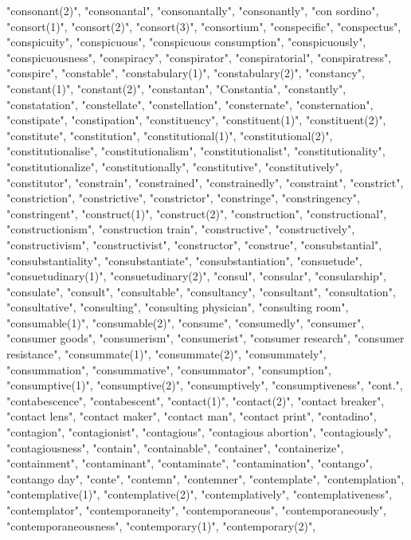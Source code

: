 "consonant(2)",
"consonantal",
"consonantally",
"consonantly",
"con sordino",
"consort(1)",
"consort(2)",
"consort(3)",
"consortium",
"conspecific",
"conspectus",
"conspicuity",
"conspicuous",
"conspicuous consumption",
"conspicuously",
"conspicuousness",
"conspiracy",
"conspirator",
"conspiratorial",
"conspiratress",
"conspire",
"constable",
"constabulary(1)",
"constabulary(2)",
"constancy",
"constant(1)",
"constant(2)",
"constantan",
"Constantia",
"constantly",
"constatation",
"constellate",
"constellation",
"consternate",
"consternation",
"constipate",
"constipation",
"constituency",
"constituent(1)",
"constituent(2)",
"constitute",
"constitution",
"constitutional(1)",
"constitutional(2)",
"constitutionalise",
"constitutionalism",
"constitutionalist",
"constitutionality",
"constitutionalize",
"constitutionally",
"constitutive",
"constitutively",
"constitutor",
"constrain",
"constrained",
"constrainedly",
"constraint",
"constrict",
"constriction",
"constrictive",
"constrictor",
"constringe",
"constringency",
"constringent",
"construct(1)",
"construct(2)",
"construction",
"constructional",
"constructionism",
"construction train",
"constructive",
"constructively",
"constructivism",
"constructivist",
"constructor",
"construe",
"consubstantial",
"consubstantiality",
"consubstantiate",
"consubstantiation",
"consuetude",
"consuetudinary(1)",
"consuetudinary(2)",
"consul",
"consular",
"consularship",
"consulate",
"consult",
"consultable",
"consultancy",
"consultant",
"consultation",
"consultative",
"consulting",
"consulting physician",
"consulting room",
"consumable(1)",
"consumable(2)",
"consume",
"consumedly",
"consumer",
"consumer goods",
"consumerism",
"consumerist",
"consumer research",
"consumer resistance",
"consummate(1)",
"consummate(2)",
"consummately",
"consummation",
"consummative",
"consummator",
"consumption",
"consumptive(1)",
"consumptive(2)",
"consumptively",
"consumptiveness",
"cont.",
"contabescence",
"contabescent",
"contact(1)",
"contact(2)",
"contact breaker",
"contact lens",
"contact maker",
"contact man",
"contact print",
"contadino",
"contagion",
"contagionist",
"contagious",
"contagious abortion",
"contagiously",
"contagiousness",
"contain",
"containable",
"container",
"containerize",
"containment",
"contaminant",
"contaminate",
"contamination",
"contango",
"contango day",
"conte",
"contemn",
"contemner",
"contemplate",
"contemplation",
"contemplative(1)",
"contemplative(2)",
"contemplatively",
"contemplativeness",
"contemplator",
"contemporaneity",
"contemporaneous",
"contemporaneously",
"contemporaneousness",
"contemporary(1)",
"contemporary(2)",

